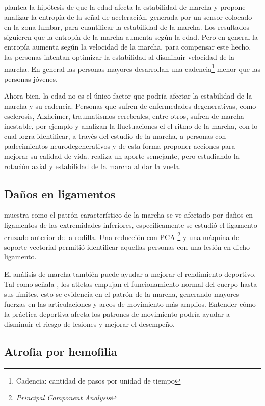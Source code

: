\cite{arif} plantea la hipótesis de que la edad afecta la estabilidad de marcha y propone analizar la entropía de la señal de aceleración, generada por un sensor colocado en la zona lumbar, para cuantificar la estabilidad de la marcha. Los resultados siguieren que la entropía de la marcha aumenta según la edad. Pero en general la entropía aumenta según la velocidad de la marcha, para compensar este hecho, las personas intentan optimizar la estabilidad al disminuir velocidad de la marcha. En general las personas mayores desarrollan una cadencia\footnote{Cadencia: cantidad de pasos por unidad de tiempo} menor que las personas jóvenes. 

Ahora bien, la edad no es el único factor que podría afectar la estabilidad de la marcha y su cadencia. Personas que sufren de enfermedades degenerativas, como esclerosis, Alzheimer, traumatismos cerebrales, entre otros, sufren de marcha inestable, por ejemplo \cite{ren} y \cite{wu} analizan la fluctuaciones el el ritmo de la marcha, con lo cual logra identificar, a través del estudio de la marcha, a personas con padecimientos neurodegenerativos y de esta forma proponer acciones para mejorar su calidad de vida. \cite{Yang} realiza un aporte semejante, pero estudiando la rotación axial y estabilidad de la marcha al dar la vuela.  

\subsection{Daños en ligamentos}

\cite{christian} muestra como el patrón característico de la marcha se ve afectado por daños en ligamentos de las extremidades inferiores, específicamente se estudió el ligamento cruzado anterior de la rodilla. Una reducción con PCA \footnote{\emph{Principal Component Analysis}} y una máquina de soporte vectorial permitió identificar aquellas personas con una lesión en dicho ligamento. 

El análisis de marcha también puede ayudar a mejorar el rendimiento deportivo. Tal como señala \cite{perry}, los atletas empujan el funcionamiento normal del cuerpo hasta sus límites, esto se evidencia en el patrón de la marcha, generando mayores fuerzas en las articulaciones y arcos de movimiento más amplios. Entender cómo la práctica deportiva afecta los patrones de movimiento podría ayudar a disminuir el riesgo de lesiones y mejorar el desempeño.  

\subsection{Atrofia por hemofilia}

